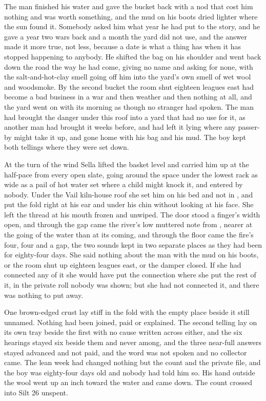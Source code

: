 \scenebreak

The man finished his water and gave the bucket back with a nod that cost him nothing and was worth something, and the mud on his boots dried lighter where the sun found it. Somebody asked him what year he had put to the story, and he gave a year two wars back and a month the yard did not use, and the answer made it more true, not less, because a date is what a thing has when it has stopped happening to anybody. He shifted the bag on his shoulder and went back down the road the way he had come, giving no name and asking for none, with the salt-and-hot-clay smell going off him into the yard's own smell of wet wool and woodsmoke. By the second bucket the room shut eighteen leagues east had become a bad business in a war and then weather and then nothing at all, and the yard went on with its morning as though no stranger had spoken. The man had brought the danger under this roof into a yard that had no use for it, as another man had brought it weeks before, and had left it lying where any passer-by might take it up, and gone home with his bag and his mud. The boy kept both tellings where they were set down.

At the turn of the wind Sella lifted the basket level and carried him up  at the half-pace from every open slate, going around the space under the lowest rack as wide as a pail of hot water set where a child might knock it, and entered by nobody. Under the Vail kiln-house roof she set him on his bed and not in , and put the fold right at his ear and under his chin without looking at his face. She left the thread at his mouth frozen and unwiped. The door stood a finger's width open, and through the gap came the river's low muttered note from , nearer at the going of the water than at its coming, and through the floor came the fire's four, four and a gap, the two sounds kept in two separate places as they had been for eighty-four days. She said nothing about the man with the mud on his boots, or the room shut up eighteen leagues east, or the damper closed. If she had connected any of it she would have put the connection where she put the rest of it, in the private roll nobody was shown; but she had not connected it, and there was nothing to put away.

One brown-edged crust lay stiff in the fold with the empty place beside it still unnamed. Nothing had been joined, paid or explained. The second telling lay on its own tray beside the first with no cause written across either, and the six hearings stayed six beside them and never among, and the three near-full answers stayed advanced and not paid, and the word was not spoken and no collector came. The lean week had changed nothing but the count and the private file, and the boy was eighty-four days old and nobody had told him so. His hand outside the wool went up an inch toward the water and came down. The count crossed into Silt 26 unspent.
